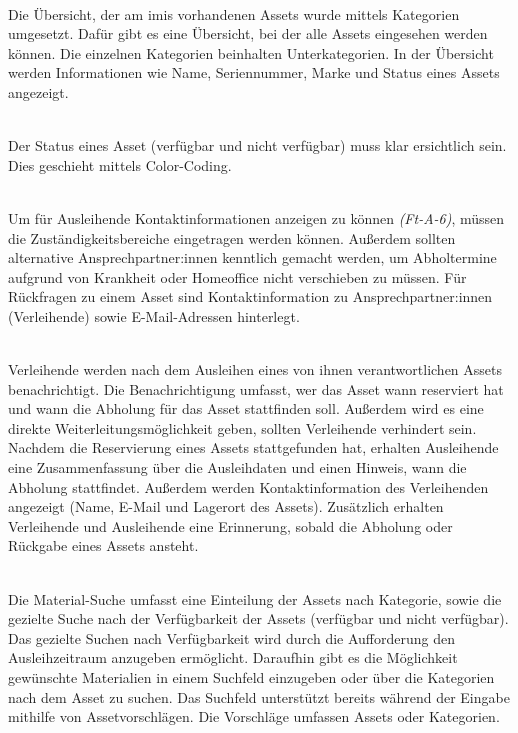     {\sffamily\color{maincolor}{Ft-VA-2 | Übersicht über ausleihbare Assets }}\\
Die Übersicht, der am \ac{imis} vorhandenen Assets wurde mittels Kategorien umgesetzt. Dafür gibt es
eine Übersicht, bei der alle Assets eingesehen werden können. Die einzelnen Kategorien beinhalten
Unterkategorien. In der Übersicht werden Informationen wie Name, Seriennummer, Marke und Status
eines Assets angezeigt.

    {\sffamily\color{maincolor}{Ft-VA-3 |  Verfügbarkeit von Assets }}\\
Der Status eines Asset (verfügbar und nicht verfügbar) muss klar ersichtlich sein.
Dies geschieht mittels Color-Coding.  


{\sffamily\color{maincolor}{Ft-VA-4 | Zuständigkeitsbereich }}\\
Um für Ausleihende Kontaktinformationen anzeigen zu können \textit{(Ft-A-6)}, müssen die
Zuständigkeitsbereiche eingetragen werden können. Außerdem sollten alternative Ansprechpartner:innen
kenntlich gemacht werden, um Abholtermine aufgrund von Krankheit oder Homeoffice nicht verschieben
zu müssen. Für Rückfragen zu einem Asset sind Kontaktinformation zu Ansprechpartner:innen
(Verleihende) sowie E-Mail-Adressen hinterlegt.

    {\sffamily\color{maincolor}{Ft-VA-5 | Benachrichtigungen \& Erinnerungen }}\\
Verleihende werden nach dem Ausleihen eines von ihnen verantwortlichen Assets benachrichtigt. Die
Benachrichtigung umfasst, wer das Asset wann reserviert hat und wann die Abholung für
das Asset stattfinden soll. Außerdem wird es eine direkte Weiterleitungsmöglichkeit geben, sollten
Verleihende verhindert sein. Nachdem die Reservierung eines Assets stattgefunden hat, erhalten
Ausleihende eine Zusammenfassung über die Ausleihdaten und einen Hinweis, wann die Abholung
stattfindet. Außerdem werden Kontaktinformation des Verleihenden angezeigt (Name, E-Mail und
Lagerort des Assets). Zusätzlich erhalten Verleihende und Ausleihende eine Erinnerung, sobald die
Abholung oder Rückgabe eines Assets ansteht.


    {\sffamily\color{maincolor}{Ft-VA-6 | Material-Suche }}\\
Die Material-Suche umfasst eine Einteilung der Assets nach Kategorie, sowie die gezielte Suche nach
der Verfügbarkeit der Assets (verfügbar und nicht verfügbar). Das gezielte Suchen nach
Verfügbarkeit wird durch die Aufforderung den Ausleihzeitraum anzugeben ermöglicht. Daraufhin gibt
es die Möglichkeit gewünschte Materialien in einem Suchfeld einzugeben oder über die Kategorien nach
dem Asset zu suchen. Das Suchfeld unterstützt bereits während der Eingabe mithilfe von
Assetvorschlägen. Die Vorschläge umfassen Assets oder Kategorien.

